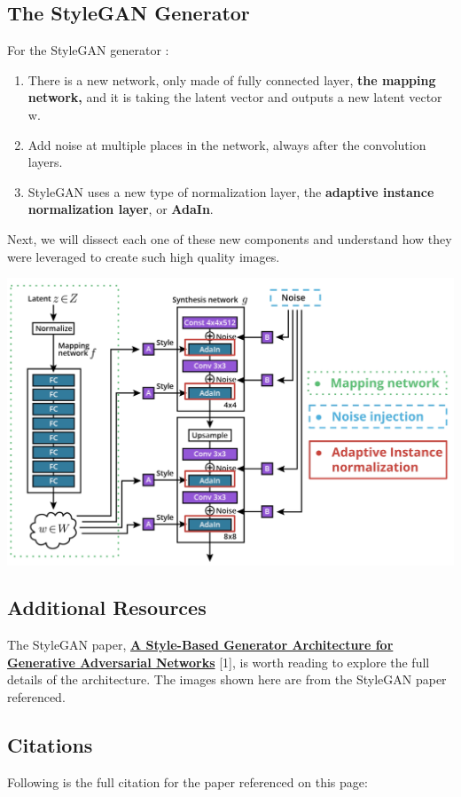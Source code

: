 \subsection{The StyleGAN Generator}
For the StyleGAN generator :

\begin{enumerate}
    \item There is a new network, only made of fully connected layer, \textbf{the mapping network,} and it is taking the latent vector and outputs a new latent vector w.
    \item Add noise at multiple places in the network, always after the convolution layers.
    \item StyleGAN uses a new type of normalization layer, the \textbf{adaptive instance normalization layer}, or \textbf{AdaIn}.
\end{enumerate}
Next, we will dissect each one of these new components and understand how they were leveraged to create such high quality images.

\includegraphics[width=1\linewidth]{img//genAdvNet//modernGAN/screen-shot-2022-06-30-at-4.13.35-pm.jpeg}


\subsection{Additional Resources}
The StyleGAN paper, \href{https://arxiv.org/pdf/1812.04948.pdf}{\textbf{A Style-Based Generator Architecture for Generative Adversarial Networks}} [1], is worth reading to explore the full details of the architecture. The images shown here are from the StyleGAN paper referenced.

\subsection{Citations}
Following is the full citation for the paper referenced on this page: \newline

